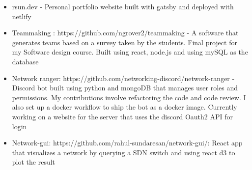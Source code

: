 
\divider
{}


    \cvtag{\LaTeX}



\begin{itemize}
    \item rsun.dev - Personal portfolio website built with gatsby and deployed with netlify
    \item Teammaking : https://github.com/ngrover2/teammaking - A software that generates teams based on a survey taken by the students. Final project for my Software design course. Built using react, node.js and using mySQL as the database
    \item Network ranger:  https://github.com/networking-discord/network-ranger - 
    Discord bot built using python and mongoDB that manages user roles and permissions. My contributions involve refactoring the code and code review. I also set up a docker workflow to ship the bot as a docker image. Currently working on a website for the server that uses the discord Oauth2 API for login
    \item Network-gui: https://github.com/rahul-sundaresan/network-gui/: React app that visualizes a network by querying a SDN switch and using react d3 to plot the result 
\end{itemize}









